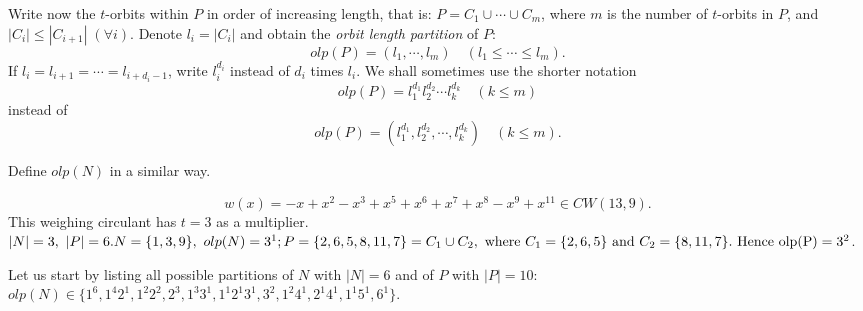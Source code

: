 { Write now the $t$-orbits 
within $P$ in order of increasing length, that is: 
$ P = {C_{1}} \cup {\cdots} \cup {C_{m}} $, where $ m $ is the number of $t$-orbits 
in $P$, and $ |C_{i}| \leq |C_{i+1}| \; (\forall i)$. 
Denote $ l_{i}=|C_{i}| $ and obtain the 
{\it orbit length partition} of $ P$:  
	      $$ olp(P)=(l_{1},\cdots,l_{m}) \quad (l_{1} \leq \cdots \leq l_{m}).$$ 
If $l_{i}=l_{i+1}= \cdots =l_{i+d_{i}-1}$, write $l^{d_{i}}_{i}$ instead of
$d_{i}$ times $l_{i}$. We shall sometimes use the shorter notation 
$$olp(P)=l^{d_1}_{1}l^{d_2}_{2} \cdots l^{d_k}_{k} \quad (k \leq m)$$
instead of 
$$olp(P)=(l^{d_1}_{1},l^{d_2}_{2}, \cdots, l^{d_k}_{k}) \quad (k \leq m).$$

Define $ olp(N)$ in a similar way.


\begin{ex}

$$w(x)=-x+x^2-x^3+x^5+x^6+x^7+x^8-x^9+x^{11} \in CW(13,9).$$ 
{\rm This weighing circulant has $ t=3$ as a multiplier.} \\
$ |N|=3,\ |P|=6.\\
N=\{1,3,9\}, \   olp(N)=3^1;\\
 P=\{2,6,5,8,11,7\}=C_1 \cup C_2, \ {\rm where} \ C_1=\{2,6,5\} \ {\rm and} \ 
 C_2=\{8,11,7\}. \rm \ Hence \   olp(P)=3^2$.
%
\end{ex}

Let us start by listing all possible partitions of $ N$ with  
$|N|=6 $ and  of $P$ with $|P|=10$:\\

$ olp(N) \in \{ 1^{6}, 1^{4}2^{1}, 1^{2}2^{2}, 2^{3}, 1^{3}3^{1}, 1^{1}2^{1}3^{1}, 3^{2},  
   1^{2}4^{1}, 2^{1}4^{1}, 1^{1}5^{1}, 6^{1} \}. $\\

}
